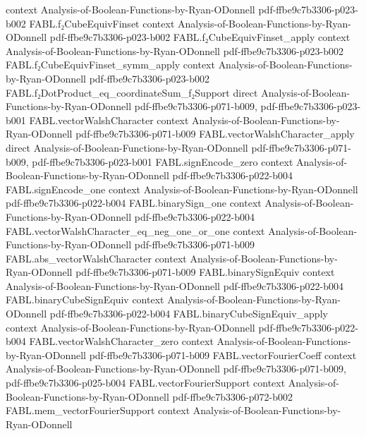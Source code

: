 \begin{theorem}
  {context}
  {Analysis-of-Boolean-Functions-by-Ryan-ODonnell}
  {pdf-ffbe9c7b3306-p023-b002}
\proofstep
  {FABL.f₂CubeEquivFinset}
  {context}
  {Analysis-of-Boolean-Functions-by-Ryan-ODonnell}
  {pdf-ffbe9c7b3306-p023-b002}
\proofstep
  {FABL.f₂CubeEquivFinset_apply}
  {context}
  {Analysis-of-Boolean-Functions-by-Ryan-ODonnell}
  {pdf-ffbe9c7b3306-p023-b002}
\proofstep
  {FABL.f₂CubeEquivFinset_symm_apply}
  {context}
  {Analysis-of-Boolean-Functions-by-Ryan-ODonnell}
  {pdf-ffbe9c7b3306-p023-b002}
\proofstep
  {FABL.f₂DotProduct_eq_coordinateSum_f₂Support}
  {direct}
  {Analysis-of-Boolean-Functions-by-Ryan-ODonnell}
  {pdf-ffbe9c7b3306-p071-b009,
    pdf-ffbe9c7b3306-p023-b001}
\proofstep
  {FABL.vectorWalshCharacter}
  {context}
  {Analysis-of-Boolean-Functions-by-Ryan-ODonnell}
  {pdf-ffbe9c7b3306-p071-b009}
\proofstep
  {FABL.vectorWalshCharacter_apply}
  {direct}
  {Analysis-of-Boolean-Functions-by-Ryan-ODonnell}
  {pdf-ffbe9c7b3306-p071-b009,
    pdf-ffbe9c7b3306-p023-b001}
\proofstep
  {FABL.signEncode_zero}
  {context}
  {Analysis-of-Boolean-Functions-by-Ryan-ODonnell}
  {pdf-ffbe9c7b3306-p022-b004}
\proofstep
  {FABL.signEncode_one}
  {context}
  {Analysis-of-Boolean-Functions-by-Ryan-ODonnell}
  {pdf-ffbe9c7b3306-p022-b004}
\proofstep
  {FABL.binarySign_one}
  {context}
  {Analysis-of-Boolean-Functions-by-Ryan-ODonnell}
  {pdf-ffbe9c7b3306-p022-b004}
\proofstep
  {FABL.vectorWalshCharacter_eq_neg_one_or_one}
  {context}
  {Analysis-of-Boolean-Functions-by-Ryan-ODonnell}
  {pdf-ffbe9c7b3306-p071-b009}
\proofstep
  {FABL.abs_vectorWalshCharacter}
  {context}
  {Analysis-of-Boolean-Functions-by-Ryan-ODonnell}
  {pdf-ffbe9c7b3306-p071-b009}
\proofstep
  {FABL.binarySignEquiv}
  {context}
  {Analysis-of-Boolean-Functions-by-Ryan-ODonnell}
  {pdf-ffbe9c7b3306-p022-b004}
\proofstep
  {FABL.binaryCubeSignEquiv}
  {context}
  {Analysis-of-Boolean-Functions-by-Ryan-ODonnell}
  {pdf-ffbe9c7b3306-p022-b004}
\proofstep
  {FABL.binaryCubeSignEquiv_apply}
  {context}
  {Analysis-of-Boolean-Functions-by-Ryan-ODonnell}
  {pdf-ffbe9c7b3306-p022-b004}
\proofstep
  {FABL.vectorWalshCharacter_zero}
  {context}
  {Analysis-of-Boolean-Functions-by-Ryan-ODonnell}
  {pdf-ffbe9c7b3306-p071-b009}
\proofstep
  {FABL.vectorFourierCoeff}
  {context}
  {Analysis-of-Boolean-Functions-by-Ryan-ODonnell}
  {pdf-ffbe9c7b3306-p071-b009,
    pdf-ffbe9c7b3306-p025-b004}
\proofstep
  {FABL.vectorFourierSupport}
  {context}
  {Analysis-of-Boolean-Functions-by-Ryan-ODonnell}
  {pdf-ffbe9c7b3306-p072-b002}
\proofstep
  {FABL.mem_vectorFourierSupport}
  {context}
  {Analysis-of-Boolean-Functions-by-Ryan-ODonnell}

\end{theorem}
